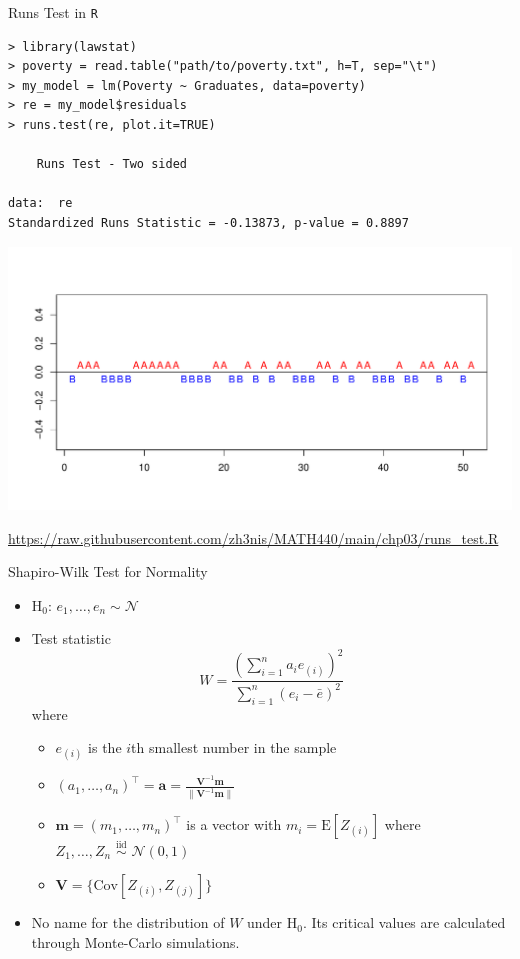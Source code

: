 \documentclass{beamer}
\newcommand{\E}{\mathrm{E}}
\newcommand{\Cov}{\mathrm{Cov}}
\begin{document}
\begin{frame}[fragile]{Runs Test in \texttt{R}}

\begin{small}
\begin{verbatim}
> library(lawstat)
> poverty = read.table("path/to/poverty.txt", h=T, sep="\t")
> my_model = lm(Poverty ~ Graduates, data=poverty)
> re = my_model$residuals
> runs.test(re, plot.it=TRUE)    
	
	Runs Test - Two sided

data:  re
Standardized Runs Statistic = -0.13873, p-value = 0.8897
\end{verbatim}
\end{small}

\centerline{\includegraphics[width=.7\textwidth]{plots/runs.pdf}}

{\color{blue}\url{https://raw.githubusercontent.com/zh3nis/MATH440/main/chp03/runs_test.R}}    
\end{frame}


\begin{frame}{Shapiro-Wilk Test for Normality}
\begin{itemize}
    \item $\mathrm{H}_0:\,e_1,\ldots,e_n\sim\mathcal{N}$
    \item<2->Test statistic
    $$
    W=\frac{\left(\sum_{i=1}^n a_i e_{(i)}\right)^2}{\sum_{i=1}^n(e_i-\bar{e})^2}
    $$
    where
    \begin{itemize}
        \item<3-> $e_{(i)}$ is the $i$th smallest number in the sample
        \item<4-> $(a_1,\ldots,a_n)^\top=\mathbf{a}=\frac{\mathbf{V}^{-1}\mathbf{m}}{\|\mathbf{V}^{-1}\mathbf{m}\|}$
        \item<5->$\mathbf{m}=(m_1,\ldots,m_n)^\top$ is a vector with $m_i=\E[Z_{(i)}]$ where $Z_1,\ldots,Z_n\,\,{\stackrel{\text{iid}}{\sim}}\,\,\mathcal{N}(0,1)$
        \item<6->$\mathbf{V}=\{\Cov[Z_{(i)},Z_{(j)}]\}$
    \end{itemize}
    \item<7->No name for the distribution of $W$ under $\mathrm{H}_0$. Its critical values are calculated through Monte-Carlo simulations.
\end{itemize}
\end{frame}
\end{document}
